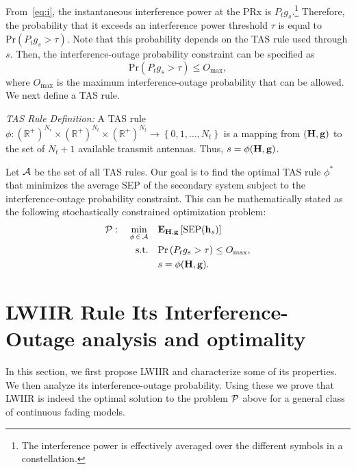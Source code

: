 \documentclass[12pt,draftcls,peerreview,onecolumn]{IEEEtran}
\newcommand{\brac}[1]{\left({#1}\right)}
\newcommand{\mtx}[1]{{\bf #1}} %
\newcommand{\explow}[2]{{\bf{E}}_{#1}\left[{#2}\right]}
\newcommand{\prob}[1]{\text{Pr}\brac{#1}}
\newcommand{\SEP}{\text{SEP}}
\newcommand{\nx}{{0}}
\newcommand{\lam}{\lambda}
\newcommand{\Nt}{{N_t}}
\newcommand{\Nr}{{N_r}}
\newcommand{\Pt}{{P_t}}
\newcommand{\puch}{g}
\newcommand{\gk}[1]{{\puch_{#1}}}
\newcommand{\g}{\mathbf{\puch}}
\newcommand{\outmax}{O_{\text{max}}}
\newcommand{\itau}{\tau}
\newcommand{\allopts}{\left\{\nx,1,\ldots,\Nt\right\}}
\newcommand{\asrule}{\phi}
\newcommand{\asspan}{{\cal A}}
\newcommand{\Hmx}{\mtx{H}}
\newcommand{\optproblem}{{\cal P}}
\begin{document}
From~\eqref{eq:i}, the instantaneous interference power at the PRx is $\Pt\gk{s}$.\footnote{The interference power is effectively averaged over the different symbols in a constellation.} Therefore, the probability that it exceeds an interference power threshold $\itau$ is equal to $\prob{\Pt\gk{s}>\itau}$. Note that this probability depends on the TAS rule used through $s$. Then, the interference-outage probability constraint can be specified as 
\begin{equation}
\prob{\Pt\gk{s}>\itau} \leq \outmax,
\label{eq:iop_cons}
\end{equation}
where $\outmax$ is the maximum interference-outage probability that can be allowed. We next define a TAS rule.

{\em TAS Rule Definition:} A TAS rule $\asrule:\brac{\mathbb{R}^{+}}^{\Nr}\times\brac{\mathbb{R}^{+}}^{\Nt} \times \brac{\mathbb{R}^{+}}^{\Nt} \rightarrow \allopts$ is a mapping from $\left(\Hmx,\g\right)$ to the set of $\Nt+1$ available transmit antennas. Thus, $s = \phi(\Hmx,\g)$.

Let $\asspan$ be the set of all TAS  rules. Our goal is to find the optimal TAS rule $\phi^{*}$ that minimizes the average SEP of the secondary system subject to the interference-outage probability constraint. This can be mathematically stated as the  following stochastically constrained optimization problem:
\begin{align}
\optproblem: \quad \min_{\asrule\,\in\,\asspan} \quad &\explow{\Hmx,\g}{\SEP(\hs)} \\
\label{eq:objective}
\text{s.t.} \quad &\prob{\Pt\gk{s}>\itau} \leq \outmax, \\
 &s = \phi(\Hmx,\g). 
\end{align}



\section{LWIIR Rule Its Interference-Outage analysis and optimality}
\label{sec:analysis}

In this section, we first propose LWIIR and characterize some of its properties.  We then analyze its interference-outage probability. Using these we  prove that LWIIR is indeed the optimal solution to the problem $\optproblem$ above for a general class of continuous fading models. %
\end{document}

